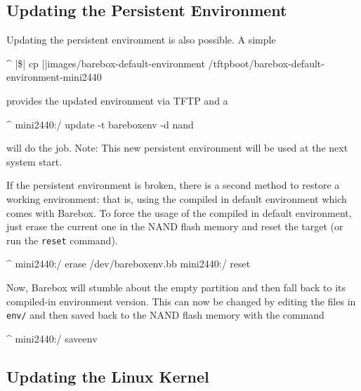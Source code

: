 \subsection{Updating the Persistent Environment}


Updating the persistent environment is also possible. A simple

\begin{ptxshell}[escapechar=|]{^}
|\$| cp |\ptxdistPlatformDir |images/barebox-default-environment /tftpboot/barebox-default-environment-mini2440
\end{ptxshell}

provides the updated environment via TFTP and a

\begin{ptxshell}[escapechar=|]{^}
mini2440:/ update -t bareboxenv -d nand
\end{ptxshell}

will do the job. Note: This new persistent environment will be used at the next
system start.

If the persistent environment is broken, there is a second method to restore a
working environment: that is, using the compiled in default environment which
comes with Barebox.
To force the usage of the compiled in default environment, just erase the
current one in the NAND flash memory and reset the target (or run the
\texttt{reset} command).

\begin{ptxshell}[escapechar=|]{^}
mini2440:/ erase /dev/bareboxenv.bb
mini2440:/ reset
\end{ptxshell}

Now, Barebox will stumble about the empty partition and then fall back to its
compiled-in environment version. This can now be changed by editing the files
in \texttt{env/} and then saved back to the NAND flash memory with the command

\begin{ptxshell}[escapechar=|]{^}
mini2440:/ saveenv
\end{ptxshell}

\subsection{Updating the Linux Kernel}

